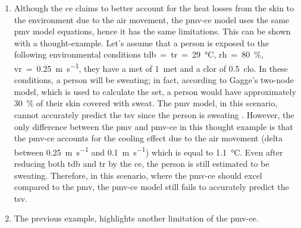 \begin{enumerate}
    \item Although the \ac{ce} claims to better account for the heat losses from the skin to the environment due to the air movement, the \ac{pmv-ce} model uses the same \ac{pmv} model equations, hence it has the same limitations.
    This can be shown with a thought-example.
    Let's assume that a person is exposed to the following environmental conditions \ac{tdb}~=~\ac{tr}~=~\qty{29}{\celsius}, \ac{rh}~=~\qty{80}{\percent}, \ac{vr}~=~\qty{0.25}{\m\per\s}, they have a \ac{met} of \qty{1}{met} and a \ac{clor} of \qty{0.5}{clo}.
    In these conditions, a person will be sweating; in fact, according to Gagge's two-node model, which is used to calculate the \ac{set}, a person would have approximately \qty{30}{\percent} of their skin covered with sweat.
    The \ac{pmv} model, in this scenario, cannot accurately predict the \ac{tsv} since the person is sweating .
    However, the only difference between the \ac{pmv} and \ac{pmv-ce} in this thought example is that the \ac{pmv-ce} accounts for the cooling effect due to the air movement (delta between \qty{0.25}{\m\per\s} and \qty{0.1}{\m\per\s}) which is equal to \qty{1.1}{\celsius}.
    Even after reducing both \ac{tdb} and \ac{tr} by the \ac{ce}, the person is still estimated to be sweating.
    Therefore, in this scenario, where the \ac{pmv-ce} should excel compared to the \ac{pmv}, the \ac{pmv-ce} model still fails to accurately predict the \ac{tsv}.
    \item The previous example, highlights another limitation of the \ac{pmv-ce}.

\end{enumerate}
